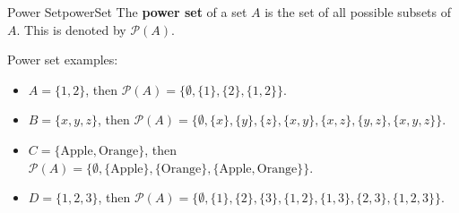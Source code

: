 \begin{definition}{Power Set}{powerSet}
  The \textbf{power set} of a set \( A \) is the set of all possible subsets of \( A \). 
  This is denoted by \( \mathcal{P}(A) \).
\end{definition}

Power set examples:
\begin{itemize}
  \item \( A = \{ 1, 2 \} \), then \( \mathcal{P}(A) = \{ \emptyset, \{ 1 \}, \{ 2 \}, \{ 1, 2 \} \} \).
  \item \( B = \{ x, y, z \} \), then \( \mathcal{P}(A) = \{ \emptyset, \{ x \}, \{ y \}, \{ z \}, 
  \{ x, y \}, \{ x, z \}, \{ y, z \}, \{ x, y, z \} \} \).
  \item \( C = \{ \text{Apple}, \text{Orange} \} \), then \( \mathcal{P}(A) = \{ \emptyset,
  \{ \text{Apple} \}, \{ \text{Orange} \}, \{ \text{Apple}, \text{Orange} \} \} \).
  \item \( D = \{ 1, 2, 3 \} \), then \( \mathcal{P}(A) = \{ \emptyset, \{ 1 \}, \{ 2 \},
  \{ 3 \}, \{ 1, 2 \}, \{ 1, 3 \}, \{ 2, 3 \}, \{ 1, 2, 3 \} \} \).
\end{itemize}
